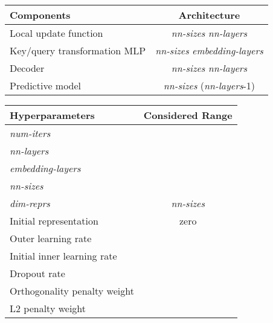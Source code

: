 \documentclass{article}
\theoremstyle{definition}
\begin{document}
\begin{table*}[!htb] 
  \centering
\begin{threeparttable}[]
  \caption{Hyperparameters for regression tasks. Local update function and the predictive model will be followed by linear transformations with output dimension of \emph{dim-reprs} and \emph{dim}(\yy) accordingly.}
  \begin{tabular}{l|c}
    \toprule
    Components &         Architecture \\ 
    \midrule
    Local update function & \emph{nn-sizes}  \emph{nn-layers} \\
    Key/query transformation MLP  & \emph{nn-sizes}  \emph{embedding-layers} \\
    Decoder & \emph{nn-sizes}  \emph{nn-layers} \\
    Predictive model & \emph{nn-sizes}  (\emph{nn-layers}-1) \\
    \bottomrule
  \end{tabular}
  \begin{tabular}{l|c}
    \toprule
    Hyperparameters &         Considered Range \\ 
    \midrule
    \emph{num-iters} &  \\
    \emph{nn-layers} & \\
    \emph{embedding-layers} &  \\
    \emph{nn-sizes} &  \\
    \emph{dim-reprs} &  \emph{nn-sizes} \\
    Initial representation  \;\;\;\;\;\;\;\;\;\;\;\;\;\;\; & zero \\ 
    \midrule 
    Outer learning rate &   \\ 
    Initial inner learning rate &  \\ 
    Dropout rate &  \\ 
    Orthogonality penalty weight &  \\ 
    L2 penalty weight &  \\ 
    \bottomrule
  \end{tabular}
  \label{tb:hyperparameters-regression}
  \end{threeparttable}
\end{table*}
\end{document}

